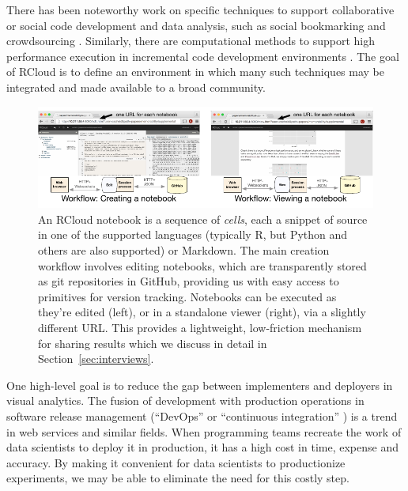 There has been noteworthy work on specific techniques
to support collaborative or social code development and data analysis,
such as social bookmarking \cite{Millen:2006:DSB} \cite{Heer:2007:VAV}
and crowdsourcing \cite{Fast:2014:ECS}.
Similarly, there are computational methods to support high
performance execution in incremental code development
environments \cite{Guo:2010:TPI}.
The goal of RCloud is to define an environment in which many such
techniques may be integrated and made available to a broad community.
\begin{figure}
\centering
\includegraphics[width=.95\linewidth]{fig/notebook/notebook.pdf}
\caption{\label{fig:notebook}An RCloud notebook is a sequence of
\emph{cells}, each a snippet of source in one of the supported languages (typically R, but Python and others are also supported) or Markdown. The main creation workflow involves editing notebooks, which are transparently stored as git repositories in GitHub, providing us with easy access to primitives for version tracking. Notebooks can be executed as they're edited (left), or in a standalone viewer (right), via a slightly different URL. This provides a lightweight, low-friction mechanism for sharing results which we discuss in detail in Section~\ref{sec:interviews}. }
\end{figure}

One high-level goal is to reduce the gap between implementers and
deployers in visual analytics. The fusion of development with
production operations in software release management (``DevOps''
\cite{Httermann:2012:DD} or ``continuous integration''
\cite{Fowler:2006:Continuous}) is a trend in web services and similar
fields.
When programming teams recreate the work of data scientists to
deploy it in production, it has a high cost in time, expense and
accuracy. By making it convenient for data scientists to productionize
experiments, we may be able to eliminate the need for this costly step.



